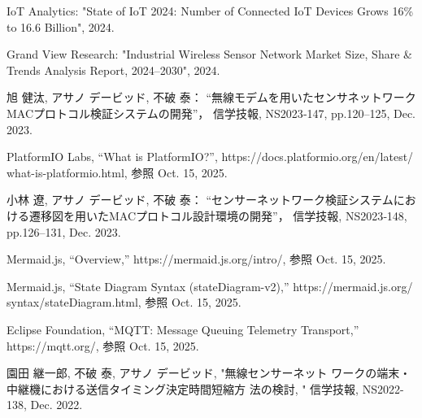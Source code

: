 \documentclass[technicalreport]{ieicej}
\begin{document}
%
%

\begin{thebibliography}{99}
 IoT Analytics: "State of IoT 2024: Number of Connected IoT Devices Grows 16\% to 16.6 Billion", 2024.  

 Grand View Research: "Industrial Wireless Sensor Network Market Size, Share \& Trends Analysis Report, 2024–2030", 2024.

旭 健汰, アサノ デービッド, 不破 泰：  
“無線モデムを用いたセンサネットワークMACプロトコル検証システムの開発”，  
信学技報,  NS2023‑147, pp.120–125, Dec. 2023.

PlatformIO Labs, “What is PlatformIO?”, 
https://docs.platformio.org/en/latest/
what-is-platformio.html, 参照 Oct. 15, 2025.

小林 遼, アサノ デービッド, 不破 泰：  
“センサーネットワーク検証システムにおける遷移図を用いたMACプロトコル設計環境の開発”，  
信学技報,  NS2023‑148, pp.126–131, Dec. 2023.  


Mermaid.js, “Overview,” 
https://mermaid.js.org/intro/, 参照 Oct. 15, 2025.

Mermaid.js, “State Diagram Syntax (stateDiagram-v2),” 
https://mermaid.js.org/
syntax/stateDiagram.html, 参照 Oct. 15, 2025.

Eclipse Foundation, “MQTT: Message Queuing Telemetry Transport,” 
https://mqtt.org/, 参照 Oct. 15, 2025.

 園田 継一郎, 不破 泰, アサノ デービッド, "無線センサーネット
ワークの端末・中継機における送信タイミング決定時間短縮方
法の検討, " 信学技報, NS2022-138, Dec. 2022.
\end{thebibliography}
\end{document}

